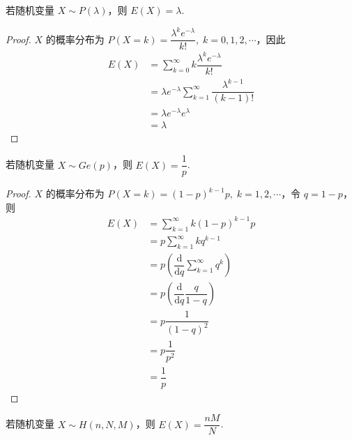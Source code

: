 \begin{conclusion}
    \indent 若随机变量 $X \sim P(\lambda)$，则 $E(X) = \lambda$.
\end{conclusion}

\begin{proof}
    $X$ 的概率分布为 $P(X=k) = \dfrac{\lambda^k e^{-\lambda}}{k!}, \; k=0,1,2,\cdots$，因此
    $$
    \begin{aligned}
        E(X) &= \sum_{k=0}^{\infty} k \dfrac{\lambda^k e^{-\lambda}}{k!} \\
        &= \lambda e^{-\lambda} \sum_{k=1}^{\infty} \dfrac{\lambda^{k-1}}{(k-1)!} \\
        &= \lambda e^{-\lambda} e^{\lambda} \\
        &= \lambda
    \end{aligned}
    $$
\end{proof}

\begin{conclusion}
    \indent 若随机变量 $X \sim Ge(p)$，则 $E(X) = \dfrac{1}{p}$.
\end{conclusion}

\begin{proof}
    $X$ 的概率分布为 $P(X=k) = (1-p)^{k-1} p, \; k=1,2,\cdots$，令 $q=1-p$，则
    $$
    \begin{aligned}
        E(X) &= \sum_{k=1}^{\infty} k (1-p)^{k-1} p \\
        &= p \sum_{k=1}^{\infty} k q^{k-1} \\
        &= p \left( \dfrac{\text{d}}{\text{d}q} \sum_{k=1}^{\infty} q^k \right) \\
        &= p \left( \dfrac{\text{d}}{\text{d}q} \dfrac{q}{1-q} \right) \\
        &= p \dfrac{1}{(1-q)^2} \\
        &= p \dfrac{1}{p^2} \\
        &= \dfrac{1}{p}
    \end{aligned}
    $$
\end{proof}

\begin{conclusion}
    \indent 若随机变量 $X \sim H(n,N,M)$，则 $E(X) = \dfrac{nM}{N}$.
\end{conclusion}

